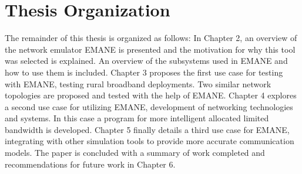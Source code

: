\section{Thesis Organization}
The remainder of this thesis is organized as follows:
In Chapter 2, an overview of the network emulator EMANE is presented and the motivation for why this tool was selected is explained. An overview of the subsystems used in EMANE and how to use them is included.
Chapter 3 proposes the first use case for testing with EMANE, testing rural broadband deployments. Two similar network topologies are proposed and tested with the help of EMANE.
Chapter 4 explores a second use case for utilizing EMANE, development of networking technologies and systems. In this case a program for more intelligent allocated limited bandwidth is developed.
Chapter 5 finally details a third use case for EMANE, integrating with other simulation tools to provide more accurate communication models.
The paper is concluded with a summary of work completed and recommendations for future work in Chapter 6.